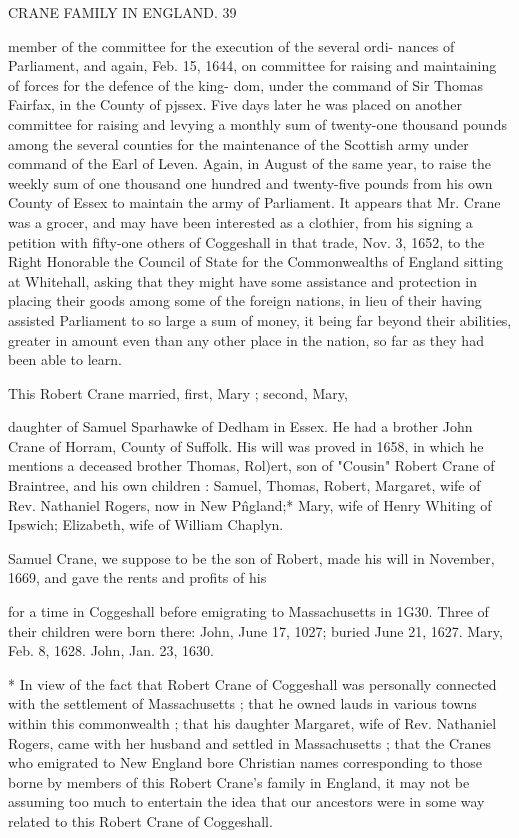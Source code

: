 CRANE FAMILY IN ENGLAND. 39 

member of the committee for the execution of the several ordi- 
nances of Parliament, and again, Feb. 15, 1644, on committee 
for raising and maintaining of forces for the defence of the king- 
dom, under the command of Sir Thomas Fairfax, in the County 
of pjssex. Five days later he was placed on another committee 
for raising and levying a monthly sum of twenty-one thousand 
pounds among the several counties for the maintenance of the 
Scottish army under command of the Earl of Leven. Again, in 
August of the same year, to raise the weekly sum of one thousand 
one hundred and twenty-five pounds from his own County of 
Essex to maintain the army of Parliament. It appears that Mr. 
Crane was a grocer, and may have been interested as a clothier, 
from his signing a petition with fifty-one others of Coggeshall in 
that trade, Nov. 3, 1652, to the Right Honorable the Council of 
State for the Commonwealths of England sitting at Whitehall, 
asking that they might have some assistance and protection in 
placing their goods among some of the foreign nations, in lieu of 
their having assisted Parliament to so large a sum of money, it 
being far beyond their abilities, greater in amount even than any 
other place in the nation, so far as they had been able to learn. 

This Robert Crane married, first, Mary ; second, Mary, 

daughter of Samuel Sparhawke of Dedham in Essex. He had a 
brother John Crane of Horram, County of Suffolk. His will was 
proved in 1658, in which he mentions a deceased brother Thomas, 
Rol)ert, son of "Cousin" Robert Crane of Braintree, and his own 
children : Samuel, Thomas, Robert, Margaret, wife of Rev. 
Nathaniel Rogers, now in New P\^ngland;* Mary, wife of Henry 
Whiting of Ipswich; Elizabeth, wife of William Chaplyn. 

Samuel Crane, we suppose to be the son of Robert, made his 
will in November, 1669, and gave the rents and profits of his 



for a time in Coggeshall before emigrating to Massachusetts in 1G30. 
Three of their children were born there: John, June 17, 1027; buried 
June 21, 1627. Mary, Feb. 8, 1628. John, Jan. 23, 1630. 

* In view of the fact that Robert Crane of Coggeshall was personally 
connected with the settlement of Massachusetts ; that he owned lauds in 
various towns within this commonwealth ; that his daughter Margaret, 
wife of Rev. Nathaniel Rogers, came with her husband and settled in 
Massachusetts ; that the Cranes who emigrated to New England bore 
Christian names corresponding to those borne by members of this 
Robert Crane's family in England, it may not be assuming too much to 
entertain the idea that our ancestors were in some way related to this 
Robert Crane of Coggeshall. 




